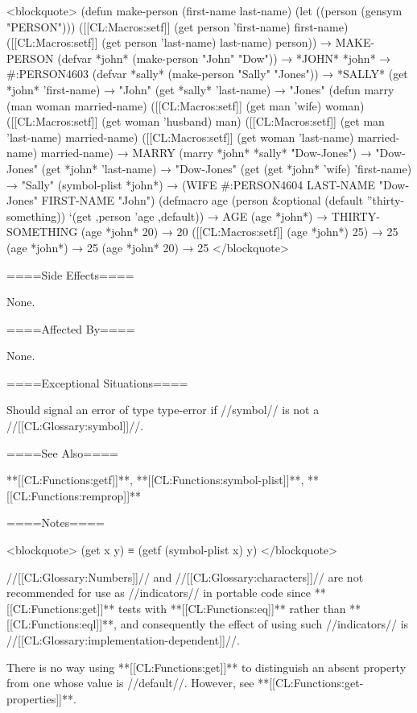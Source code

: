 <blockquote> (defun make-person (first-name last-name) (let ((person (gensym "PERSON"))) ([[CL:Macros:setf]] (get person 'first-name) first-name) ([[CL:Macros:setf]] (get person 'last-name) last-name) person)) → MAKE-PERSON (defvar *john* (make-person "John" "Dow")) → *JOHN* *john* → #:PERSON4603 (defvar *sally* (make-person "Sally" "Jones")) → *SALLY* (get *john* 'first-name) → "John" (get *sally* 'last-name) → "Jones" (defun marry (man woman married-name) ([[CL:Macros:setf]] (get man 'wife) woman) ([[CL:Macros:setf]] (get woman 'husband) man) ([[CL:Macros:setf]] (get man 'last-name) married-name) ([[CL:Macros:setf]] (get woman 'last-name) married-name) married-name) → MARRY (marry *john* *sally* "Dow-Jones") → "Dow-Jones" (get *john* 'last-name) → "Dow-Jones" (get (get *john* 'wife) 'first-name) → "Sally" (symbol-plist *john*) → (WIFE #:PERSON4604 LAST-NAME "Dow-Jones" FIRST-NAME "John") (defmacro age (person &optional (default ''thirty-something)) `(get ,person 'age ,default)) → AGE (age *john*) → THIRTY-SOMETHING (age *john* 20) → 20 ([[CL:Macros:setf]] (age *john*) 25) → 25 (age *john*) → 25 (age *john* 20) → 25 </blockquote>

====Side Effects====

None.

====Affected By====

None.

====Exceptional Situations====

Should signal an error of type type-error if //symbol// is not a //[[CL:Glossary:symbol]]//.

====See Also====

**[[CL:Functions:getf]]**, **[[CL:Functions:symbol-plist]]**, **[[CL:Functions:remprop]]**

====Notes====

<blockquote> (get x y) ≡ (getf (symbol-plist x) y) </blockquote>

//[[CL:Glossary:Numbers]]// and //[[CL:Glossary:characters]]// are not recommended for use as //indicators// in portable code since **[[CL:Functions:get]]** tests with **[[CL:Functions:eq]]** rather than **[[CL:Functions:eql]]**, and consequently the effect of using such //indicators// is //[[CL:Glossary:implementation-dependent]]//.

There is no way using **[[CL:Functions:get]]** to distinguish an absent property from one whose value is //default//. However, see **[[CL:Functions:get-properties]]**.




  
